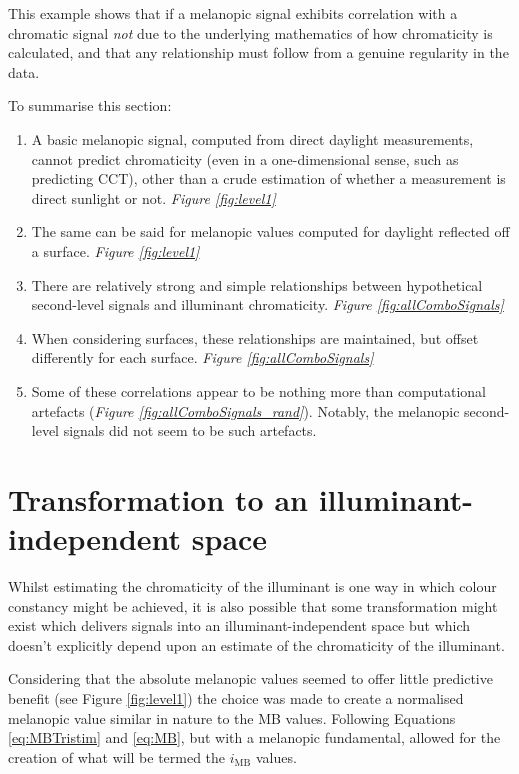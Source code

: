 This example shows that if a melanopic signal exhibits correlation with a chromatic signal \emph{not} due to the underlying mathematics of how chromaticity is calculated, and that any relationship must follow from a genuine regularity in the data.

\bigskip
\noindent
To summarise this section:

\begin{enumerate}
   \item A basic melanopic signal, computed from direct daylight measurements, cannot predict chromaticity (even in a one-dimensional sense, such as predicting \gls{CCT}), other than a crude estimation of whether a measurement is direct sunlight or not. \emph{Figure \ref{fig:level1}}
    \item The same can be said for melanopic values computed for daylight reflected off a surface. \emph{Figure \ref{fig:level1}}
    \item There are relatively strong and simple relationships between hypothetical second-level signals and illuminant chromaticity. \emph{Figure \ref{fig:allComboSignals}}
    \item When considering surfaces, these relationships are maintained, but offset differently for each surface. \emph{Figure \ref{fig:allComboSignals}}
    \item Some of these correlations appear to be nothing more than computational artefacts (\emph{Figure \ref{fig:allComboSignals_rand}}). Notably, the melanopic second-level signals did not seem to be such artefacts.
\end{enumerate}

\clearpage


\section{Transformation to an illuminant-independent space}

Whilst estimating the chromaticity of the illuminant is one way in which colour constancy might be achieved, it is also possible that some transformation might exist which delivers signals into an illuminant-independent space but which doesn't explicitly depend upon an estimate of the chromaticity of the illuminant.

Considering that the absolute melanopic values seemed to offer little predictive benefit (see Figure \ref{fig:level1}) the choice was made to create a normalised melanopic value similar in nature to the MB values. Following Equations \ref{eq:MBTristim} and \ref{eq:MB}, but with a melanopic fundamental, allowed for the creation of what will be termed the $i_{\text{MB}}$ values.

